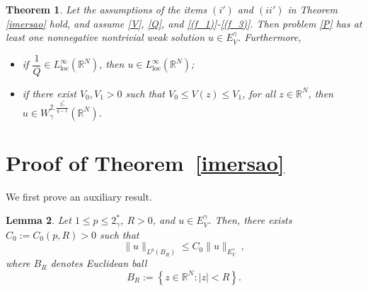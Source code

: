\documentclass[12pt]{amsart}
\newtheorem{theorem}{Theorem}[section]
\newtheorem{lemma}[theorem]{Lemma}
\newcommand{\R}{\mathbb{R}}
\begin{document}
\begin{theorem}\label{existencia_de_solucao} Let the assumptions of the items $(i')$ and $(ii')$ in Theorem \ref{imersao} hold, and assume \ref{V}, \ref{Q}, and \ref{(f_1)}-\ref{(f_3)}. Then problem \eqref{P} has at
	least one nonnegative nontrivial weak solution $u\in E_V^\gamma$. Furthermore,
	\begin{itemize}
		\item [$(i)$] if $\dfrac{1}{Q} \in L^\infty_{\mathrm{loc}}(\R^N)$, then $u\in L^\infty_{\mathrm{loc}}(\mathbb{R}^N)$;

        
		\item[$(ii)$] if there exist $V_0, V_1>0$ such that $V_0\leq V(z)\leq V_1$, for all $z\in\R^N$, then $u \in W_\gamma^{2,\frac{2^*_\gamma}{q-1}}(\R^N)$.
	\end{itemize}
\end{theorem}





\section{Proof of Theorem~\ref{imersao}}




We first prove an auxiliary result.

\begin{lemma}\label{embedding-ball}
    Let $1\leq p \leq 2^*_\gamma$, $R>0$, and $u\in E^\gamma_V$. Then, there exists $C_0:=C_0(p,R)>0$ such that
\begin{equation}\label{auxembb}
       \|u\|_{L^p(B_R)} \leq C_0 \|u\|_{E_V^\gamma} \ ,
    \end{equation}
    where $B_R$ denotes Euclidean ball 
$$B_R:=\left\lbrace z\in\mathbb{R}^N : |z|< R \right\rbrace .$$
\end{lemma}
\end{document}
